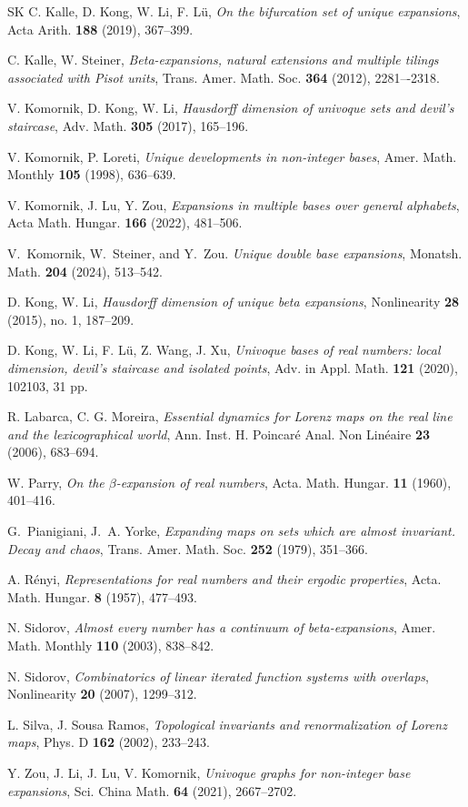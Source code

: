 \documentclass{amsart}
\theoremstyle{definition}
\numberwithin{equation}{section}
\begin{document}
\begin{thebibliography}{SK}
C. Kalle, D. Kong,  W. Li, F. L\"{u},
\emph {On the bifurcation set of unique expansions},
Acta Arith. {\bf 188} (2019), 367--399.

C. Kalle, W. Steiner,
\emph{ Beta-expansions, natural extensions and multiple tilings associated with Pisot units},
Trans. Amer. Math. Soc. {\bf 364} (2012), 2281–-2318.

V. Komornik, D. Kong, W. Li,
\emph{Hausdorff dimension of univoque sets and devil's staircase},
Adv. Math. {\bf 305} (2017), 165--196.

V. Komornik, P.  Loreti,
\emph{Unique developments in non-integer bases},
Amer. Math.  Monthly {\bf 105} (1998), 636--639.

V. Komornik, J. Lu, Y. Zou,
\emph{Expansions in multiple bases over general alphabets},
Acta Math. Hungar. {\bf 166} (2022), 481--506.

V.~Komornik, W.~Steiner, and Y.~Zou.
\emph{ Unique double base expansions},
Monatsh. Math. {\bf 204} (2024), 513--542.

D. Kong, W. Li,
\emph{Hausdorff dimension of unique beta expansions},
Nonlinearity {\bf 28} (2015), no. 1, 187--209.

D. Kong, W. Li, F. L\"{u}, Z. Wang, J. Xu,
\emph{Univoque bases of real numbers: local dimension, devil's staircase and isolated points},
Adv. in Appl. Math. {\bf 121} (2020), 102103, 31 pp.

R. Labarca, C. G. Moreira,
\emph{Essential dynamics for Lorenz maps on the real line and the lexicographical world},
Ann. Inst. H. Poincar\'{e} Anal. Non Lin\'eaire {\bf 23} (2006), 683--694.

W. Parry,
\emph{On the $\beta$-expansion of real numbers},
Acta. Math. Hungar. {\bf 11} (1960), 401--416.

G.~Pianigiani, J.~A. Yorke,
\emph{Expanding maps on sets which are almost invariant. {D}ecay and chaos},
Trans. Amer. Math. Soc. {\bf 252} (1979), 351--366.

A. R\'enyi,
\emph{Representations for real numbers and their ergodic properties},
Acta. Math. Hungar. {\bf 8} (1957), 477--493.

N. Sidorov,
\emph{Almost every number has a continuum of beta-expansions},
Amer. Math. Monthly {\bf 110} (2003), 838--842.

N. Sidorov,
\emph{Combinatorics of linear iterated function systems with overlaps},
Nonlinearity {\bf 20} (2007), 1299--312.

L. Silva, J. Sousa Ramos,
\emph{Topological invariants and renormalization of Lorenz maps},
Phys. D {\bf 162} (2002), 233--243.

Y. Zou, J. Li, J. Lu, V. Komornik,
\emph{Univoque graphs for non-integer base expansions},
Sci. China Math. {\bf 64} (2021), 2667--2702.	
\end{thebibliography}
\end{document}
